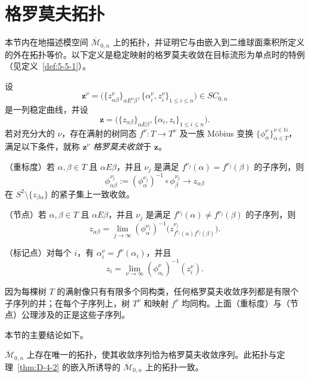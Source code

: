 
\section{格罗莫夫拓扑}\label{sec:D-5}

本节内在地描述模空间 $\overline{\mathcal M}_{0,n}$ 上的拓扑，并证明它与由嵌入到二维球面乘积所定义的外在拓扑等价。以下定义是稳定映射的格罗莫夫收敛在目标流形为单点时的特例（见定义~\ref{def:5-5-1}）。

\begin{definition}\label{def:D-5-1}
设
\[
  \mathbf z^\nu=\bigl(\{z^\nu_{\alpha\beta}\}_{\alpha E^\nu\beta},
  \{\alpha_i^\nu,z_i^\nu\}_{1\le i\le n}\bigr)\in SC_{0,n}
\]
是一列稳定曲线，并设
\[
  \mathbf z=\bigl(\{z_{\alpha\beta}\}_{\alpha E\beta},
  \{\alpha_i,z_i\}_{1\le i\le n}\bigr).
\]
若对充分大的 $\nu$，存在满射的树同态 $f^\nu:T\to T^\nu$ 及一族 Möbius 变换 $\{\phi_\alpha^\nu\}_{\alpha\in T}^{\nu\in\mathbb N}$，满足以下条件，就称 $\mathbf z^\nu$ \emph{格罗莫夫收敛}于 $\mathbf z$。

\noindent\textup{（重标度）}若 $\alpha,\beta\in T$ 且 $\alpha E\beta$，并且 $\nu_j$ 是满足 $f^{\nu_j}(\alpha)=f^{\nu_j}(\beta)$ 的子序列，则
\[
  \phi_{\alpha\beta}^{\nu_j}:=(\phi_\alpha^{\nu_j})^{-1}\circ\phi_\beta^{\nu_j}
  \longrightarrow z_{\alpha\beta}
\]
在 $S^2\setminus\{z_{\beta\alpha}\}$ 的紧子集上一致收敛。

\noindent\textup{（节点）}若 $\alpha,\beta\in T$ 且 $\alpha E\beta$，并且 $\nu_j$ 是满足 $f^{\nu_j}(\alpha)\ne f^{\nu_j}(\beta)$ 的子序列，则
\[
  z_{\alpha\beta}=\lim_{j\to\infty}
  (\phi_\alpha^{\nu_j})^{-1}
  \bigl(z_{f^{\nu_j}(\alpha)f^{\nu_j}(\beta)}^{\nu_j}\bigr).
\]

\noindent\textup{（标记点）}对每个 $i$，有 $\alpha_i^\nu=f^\nu(\alpha_i)$，并且
\[
  z_i=\lim_{\nu\to\infty}(\phi_{\alpha_i}^\nu)^{-1}(z_i^\nu).
\]
\end{definition}

因为每棵树 $T$ 的满射像只有有限多个同构类，任何格罗莫夫收敛序列都是有限个子序列的并；在每个子序列上，树 $T^\nu$ 和映射 $f^\nu$ 均同构。上面（重标度）与（节点）公理涉及的正是这些子序列。

本节的主要结论如下。

\begin{theorem}\label{thm:D-5-2}
$\overline{\mathcal M}_{0,n}$ 上存在唯一的拓扑，使其收敛序列恰为格罗莫夫收敛序列。此拓扑与定理~\ref{thm:D-4-2} 的嵌入所诱导的 $\overline{\mathcal M}_{0,n}$ 上的拓扑一致。
\end{theorem}

